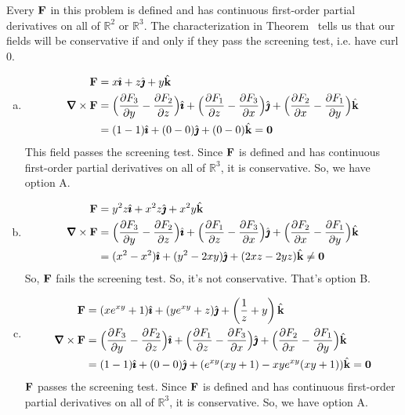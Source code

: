 \begin{solution}
Every $\mathbf{F}$ in this problem is defined and has continuous first-order partial derivatives on all of $\mathbb R^2$ or $\mathbb R^3$. The characterization in Theorem~ tells us that our fields will be conservative if and only if they pass the screening test, i.e. have curl 0.

\begin{enumerate}[a.]
\item \begin{align*}\vF&=x\hi + z\hj + y\hk\\
\vnabla \times \vF&=\Big(\frac{\partial F_3}{\partial y} -\frac{\partial F_2}{\partial z} \Big)\hi
+\Big(\frac{\partial F_1}{\partial z} -\frac{\partial F_3}{\partial x} \Big)\hj
+\Big(\frac{\partial F_2}{\partial x} -\frac{\partial F_1}{\partial y} \Big)\hk\\
&=(1-1)\hi+(0-0)\hj+(0-0)\hk = \mathbf0
\end{align*}
This field passes the screening test.  Since $\mathbf{F}$ is defined and has continuous first-order partial derivatives on all of $\mathbb R^3$, it is conservative. So, we have option A.

\item  \begin{align*}\vF&=y^2z\hi + x^2z\hj + x^2y\hk\\
\vnabla \times \vF&=\Big(\frac{\partial F_3}{\partial y} -\frac{\partial F_2}{\partial z} \Big)\hi
+\Big(\frac{\partial F_1}{\partial z} -\frac{\partial F_3}{\partial x} \Big)\hj
+\Big(\frac{\partial F_2}{\partial x} -\frac{\partial F_1}{\partial y} \Big)\hk\\
&=(x^2-x^2)\hi+(y^2-2xy)\hj+(2xz-2yz)\hk \neq \mathbf0
\end{align*}
So, $\mathbf{F}$ fails the screening test.  So, it's not conservative. That's option B.

\item 
 \begin{align*}\vF&=(xe^{xy}+1)\hi + (ye^{xy}+z)\hj + \left( \frac1z+y\right)\hk\\
\vnabla \times \vF&=\Big(\frac{\partial F_3}{\partial y} -\frac{\partial F_2}{\partial z} \Big)\hi
+\Big(\frac{\partial F_1}{\partial z} -\frac{\partial F_3}{\partial x} \Big)\hj
+\Big(\frac{\partial F_2}{\partial x} -\frac{\partial F_1}{\partial y} \Big)\hk\\
&=(1-1)\hi+(0-0)\hj+(e^{xy}(xy+1)-xye^{xy}(xy+1))\hk = \mathbf0
\end{align*}
$\mathbf{F}$ passes the screening test. Since $\mathbf{F}$ is defined and has continuous first-order partial derivatives on all of $\mathbb R^3$, it is conservative. So, we have option A.


\end{enumerate}
\end{solution}
